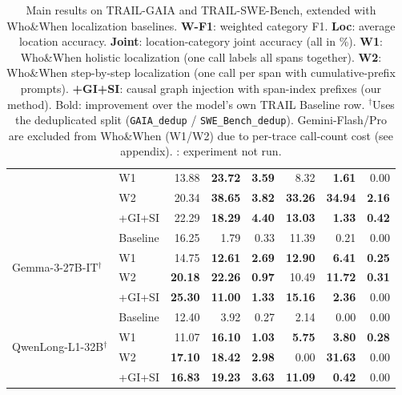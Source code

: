 \begin{table}[t]
\begin{tabular}{l l rrr @{\hspace{10pt}} rrr}
  & W1        & 13.88 & \textbf{23.72} & \textbf{3.59} &
                8.32 & \textbf{1.61} &  0.00 \\
  & W2        & 20.34 & \textbf{38.65} & \textbf{3.82} &
               \textbf{33.26} & \textbf{34.94} & \textbf{2.16} \\
  & +GI+SI    & 22.29 & \textbf{18.29} & \textbf{4.40} &
               \textbf{13.03} & \textbf{1.33} & \textbf{0.42} \\[3pt]
\multirow{4}{*}{Gemma-3-27B-IT$^{\dagger}$}
  & Baseline  & 16.25 &  1.79 &  0.33 &
               11.39 &  0.21 &  0.00 \\
  & W1        & 14.75 & \textbf{12.61} & \textbf{2.69} &
               \textbf{12.90} & \textbf{6.41} & \textbf{0.25} \\
  & W2        & \textbf{20.18} & \textbf{22.26} & \textbf{0.97} &
               10.49 & \textbf{11.72} & \textbf{0.31} \\
  & +GI+SI    & \textbf{25.30} & \textbf{11.00} & \textbf{1.33} &
               \textbf{15.16} & \textbf{2.36} &  0.00 \\[3pt]
\multirow{4}{*}{QwenLong-L1-32B$^{\dagger}$}
  & Baseline  & 12.40 &  3.92 &  0.27 &
               2.14 &  0.00 &  0.00 \\
  & W1        & 11.07 & \textbf{16.10} & \textbf{1.03} &
               \textbf{5.75} & \textbf{3.80} & \textbf{0.28} \\
  & W2        & \textbf{17.10} & \textbf{18.42} & \textbf{2.98} &
                0.00 & \textbf{31.63} &  0.00 \\
  & +GI+SI    & \textbf{16.83} & \textbf{19.23} & \textbf{3.63} &
               \textbf{11.09} & \textbf{0.42} & 0.00 \\
\bottomrule
\end{tabular}
\caption{%
  Main results on TRAIL-GAIA and TRAIL-SWE-Bench, extended with
  Who\&When localization baselines.
  \textbf{W-F1}: weighted category F1.
  \textbf{Loc}: average location accuracy.
  \textbf{Joint}: location-category joint accuracy (all in \%).
  \textbf{W1}: Who\&When holistic localization (one call labels all
  spans together).
  \textbf{W2}: Who\&When step-by-step localization (one call per span
  with cumulative-prefix prompts).
  \textbf{+GI+SI}: causal graph injection with span-index prefixes
  (our method).
  Bold: improvement over the model's own TRAIL Baseline row.
  $^{\dagger}$Uses the deduplicated split (\texttt{GAIA\_dedup} /
  \texttt{SWE\_Bench\_dedup}).
  Gemini-Flash/Pro are excluded from Who\&When (W1/W2) due to
  per-trace call-count cost (see appendix).
  \text{---}: experiment not run.%
}
\label{tab:main_results_baseline}
\end{table}


